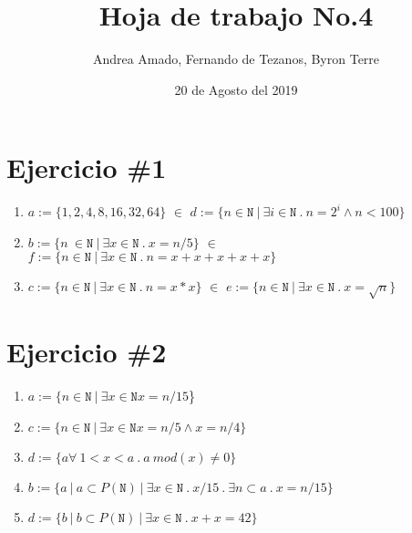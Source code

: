 \documentclass{article}
\author{Andrea Amado, Fernando de Tezanos, Byron Terre}
\title{Hoja de trabajo No.4}
\date{20 de Agosto del 2019}
\begin{document}
\linespread{1.1}



\maketitle

\section*{Ejercicio \#1 }

\begin{enumerate}



        \item{$a:=\{1,2,4,8,16,32,64\}$} {$\in$} {$d := \{n\in\mathtt{N}\ |\ \exists i\in\mathtt{N}\ .\ n=2^i\wedge n<100 \}$}



        \item{$b:=\{n\ \in \mathtt{N}\ |\ \exists x \in \mathtt{N}\ .\ x=n/5 \}$} {$\in$}  {$f:=\{ n\in\mathtt{N}\ |\ \exists x\in \mathtt{N}\ .\ n=x+x+x+x+x \}$}



        \item{$c:=\{n\in \mathtt{N}\ |\ \exists x\in\mathtt{N}\ .\ n=x*x \}$} {$\in$} {$e:=\{ n\in\mathtt{N}\ |\ \exists x\in \mathtt{N}\ .\ x=\sqrt{n} \}$}



\end{enumerate}

\section*{Ejercicio \#2}

\begin{enumerate}

    \item {$a:=\{n \in \mathtt{N} \ |\ \exists x \in \mathtt{N} x= n/15 $\}}

    \item {$c:= \{ n \in \mathtt{N} \ |\  \exists x \in \mathtt{N} x= n/5 \wedge x = n/4 \} $}

     \item {$d:= \{ a \forall \ 1 < x < a \ . \ a \ mod(x) \neq 0 \} $}

    \item {$b :=\{ a \ |\ a\subset P(\mathtt{N}) \ |\ \exists x \in \mathtt{N} \ .\ x/15 \ .\ \exists n \subset a \ .\ x=n/15\} $}

    \item {$d :=\{ b \ |\ b\subset P(\mathtt{N}) \ |\ \exists x \in \mathtt{N} \ .\ x + x = 42\} $}

\end{enumerate}
\end{document}
